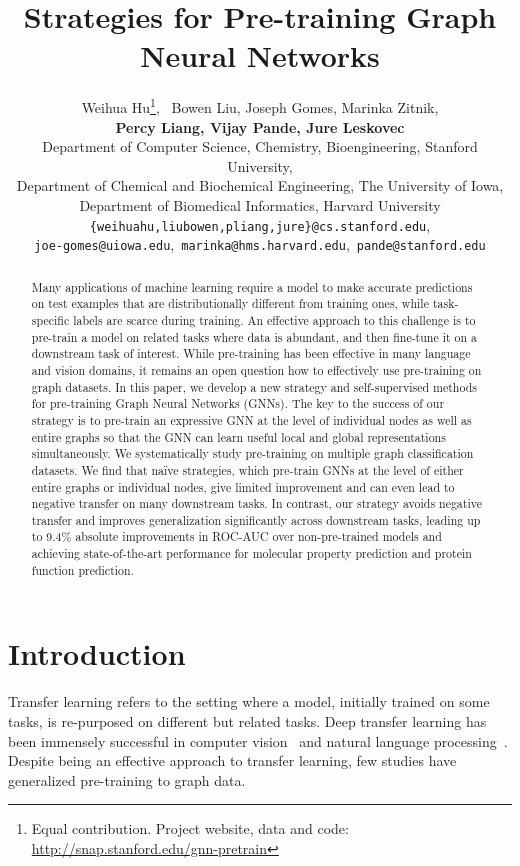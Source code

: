 \documentclass{article} \usepackage{iclr2020_conference,times}
\title{Strategies for Pre-training Graph Neural Networks}
\author{Weihua Hu\thanks{Equal contribution. Project website, data and code: \url{http://snap.stanford.edu/gnn-pretrain}}, \ Bowen Liu, Joseph Gomes, Marinka Zitnik, \\
{\bf Percy Liang, Vijay Pande, Jure Leskovec} \\
Department of Computer Science, Chemistry, Bioengineering, Stanford University,\\
Department of Chemical and Biochemical Engineering, The University of Iowa,\\
Department of Biomedical Informatics, Harvard University\\
\texttt{\{weihuahu,liubowen,pliang,jure\}@cs.stanford.edu},\\
\texttt{joe-gomes@uiowa.edu},\ \texttt{marinka@hms.harvard.edu},\ \texttt{pande@stanford.edu}
}
\numberwithin{equation}{section}
\theoremstyle{plain}
\theoremstyle{definition}
\theoremstyle{remark}
\begin{document}
\maketitle

\begin{abstract}
Many applications of machine learning require a model to make accurate predictions on test examples that are distributionally different from training ones, while task-specific labels are scarce during training. 
An effective approach to this challenge is to pre-train a model on related tasks where data is abundant, and then fine-tune it on a downstream task of interest. 
While pre-training has been effective in many language and vision domains, it remains an open question how to effectively use pre-training on graph datasets.
In this paper, we develop a new strategy and self-supervised methods for pre-training Graph Neural Networks (GNNs).
The key to the success of our strategy is to pre-train an expressive GNN at the level of individual nodes as well as entire graphs so that the GNN can learn useful local and global representations simultaneously.
We systematically study pre-training on multiple graph classification datasets. 
We find that na\"ive strategies, which pre-train GNNs at the level of either entire graphs or individual nodes, give limited improvement and can even lead to negative transfer on many downstream tasks. 
In contrast, our strategy avoids negative transfer and improves generalization significantly across downstream tasks, leading up to 9.4\% absolute improvements in ROC-AUC over non-pre-trained models and achieving state-of-the-art performance for molecular property prediction and protein function prediction. \end{abstract}

\section{Introduction}

Transfer learning refers to the setting where a model, initially trained on some tasks, is re-purposed on different but related tasks. Deep transfer learning has been immensely successful in computer vision~\citep{donahue2014decaf,girshick2014rich,zeiler2014visualizing} and natural language processing~\citep{devlin2018bert,peters2018deep,mikolov2013distributed}. Despite being an effective approach to transfer learning, few studies have generalized pre-training to graph data.
\end{document}
